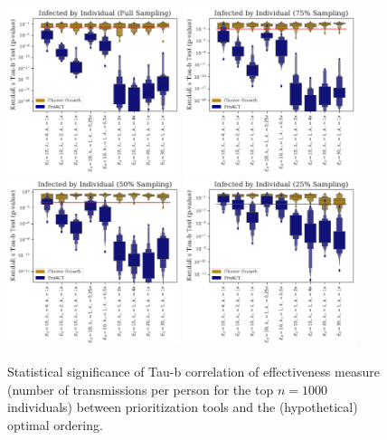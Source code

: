 \documentclass[a4paper,11pt]{article}
\begin{document}
\begin{figure}[!h]
\centering
\includegraphics[width=0.45\textwidth]{figs/results_efficacy_tau_pvalue_individual.pdf}
\includegraphics[width=0.45\textwidth]{figs/results_efficacy_tau_pvalue_individual_sub75.pdf}\\
\includegraphics[width=0.45\textwidth]{figs/results_efficacy_tau_pvalue_individual_sub50.pdf}
\includegraphics[width=0.45\textwidth]{figs/results_efficacy_tau_pvalue_individual_sub25.pdf}\\
\caption{Statistical significance of Tau-b correlation of effectiveness measure (number of transmissions per person for the top $n=1000$ individuals) between prioritization tools and the (hypothetical) optimal ordering.}\label{fig:tau-b-pvalues}
\end{figure}
\end{document}
